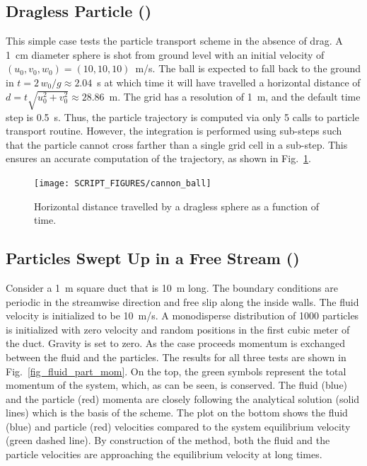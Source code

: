 \documentclass[11pt]{book}
\begin{document}
\subsection{Dragless Particle (\texorpdfstring{}{cannon\_ball})}
\label{cannon_ball}

This simple case tests the particle transport scheme in the absence of drag. A 1~cm diameter sphere is shot from ground level with an initial velocity of $(u_0,v_0,w_0)=(10,10,10)$~m/s. The ball is expected to fall back to the ground in $t=2\, w_0/g\approx 2.04$~s at which time it will have travelled a horizontal distance of $d=t \sqrt{u_0^2+v_0^2}\approx 28.86$~m. The grid has a resolution of 1~m, and the default time step is 0.5~s. Thus, the particle trajectory is computed via only 5 calls to particle transport routine. However, the integration is performed using sub-steps such that the particle cannot cross farther than a single grid cell in a sub-step. This ensures an accurate computation of the trajectory, as shown in Fig.~\ref{cannon_ball_fig}.

\begin{figure}[!ht]
\centering
\texttt{[image: SCRIPT\_FIGURES/cannon\_ball]}
\caption[The {\ct cannon\_ball} case]{Horizontal distance travelled by a dragless sphere as a function of time.}
\label{cannon_ball_fig}
\end{figure}


\subsection{Particles Swept Up in a Free Stream (\texorpdfstring{}{fluid\_part\_mom})}

Consider a 1~m square duct that is 10~m long.  The boundary conditions are periodic in the streamwise direction and free slip along the inside walls. The fluid velocity is initialized to be 10~m/s. A monodisperse distribution of 1000 particles is initialized with zero velocity and random positions in the first cubic meter of the duct. Gravity is set to zero. As the case proceeds momentum is exchanged between the fluid and the particles. The results for all three tests are shown in Fig.~\ref{fig_fluid_part_mom}.  On the top, the green symbols represent the total momentum of the system, which, as can be seen, is conserved.  The fluid (blue) and the particle (red) momenta are closely following the analytical solution (solid lines) which is the basis of the scheme.  The plot on the bottom shows the fluid (blue) and particle (red) velocities compared to the system equilibrium velocity (green dashed line).  By construction of the method, both the fluid and the particle velocities are approaching the equilibrium velocity at long times.
\end{document}
